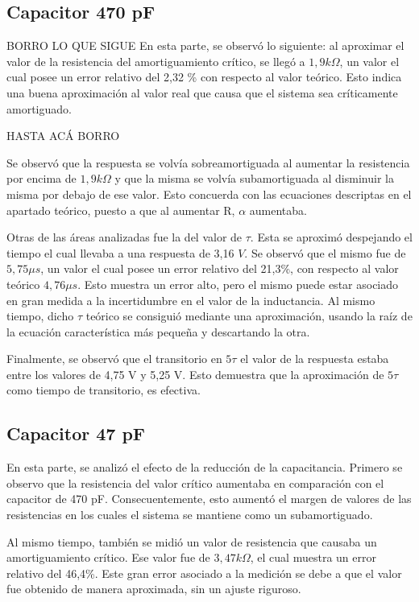 \documentclass{article}
\begin{document}
        \subsection*{Capacitor 470 pF}
        BORRO LO QUE SIGUE
        	En esta parte, se observó lo siguiente: al aproximar el valor de la resistencia del 
            amortiguamiento crítico, se llegó a $1,9 k\Omega$, un valor el cual posee un error 
            relativo del 2,32 \% 
            con respecto al valor teórico. Esto indica una buena aproximación al valor real que
             causa que el sistema sea críticamente amortiguado. \par
        HASTA ACÁ BORRO \par
	Se observó que la respuesta se volvía sobreamortiguada al aumentar la resistencia
     por encima de $1,9 k\Omega$ y que la misma se volvía subamortiguada al disminuir la misma por 
     debajo de ese valor. Esto concuerda con las ecuaciones descriptas en el apartado teórico, puesto 
     a que al aumentar R, $\alpha$ aumentaba. \par
	Otras de las áreas analizadas fue la del valor de $\tau$. Esta se aproximó despejando el tiempo 
    el cual llevaba a una respuesta de 3,16 $V$. Se observó que el mismo fue de $5,75 \mu s$, un valor el cual posee un error relativo del 21,3\%, con respecto al valor teórico $4,76 \mu s$. Esto muestra un error alto, pero el mismo puede estar asociado en gran medida a la incertidumbre en el valor de la inductancia. Al mismo tiempo, dicho $\tau$ teórico se consiguió mediante una aproximación, usando la raíz de la ecuación característica más pequeña y descartando la otra.\par
	Finalmente, se observó que el transitorio en $5\tau$ el valor de la respuesta estaba entre los
     valores de 4,75 V y 5,25 V. Esto demuestra que la aproximación de $5\tau$ como tiempo de 
     transitorio, es efectiva.
	
	
        \subsection*{Capacitor 47 pF}
        En esta parte, se analizó el efecto de la reducción de la capacitancia. Primero se observo que la resistencia del valor crítico aumentaba en comparación con el capacitor de 470 pF. Consecuentemente, esto aumentó el margen de valores de las resistencias en los cuales el sistema se mantiene como un subamortiguado.\par
        Al mismo tiempo, también se midió un valor de resistencia que causaba un amortiguamiento crítico. Ese valor fue de $3,47 k\Omega$, el cual muestra un error relativo del 46,4\%. Este gran error asociado a la medición se debe a que el valor fue obtenido de manera aproximada, sin un ajuste riguroso.\par 
        
\end{document}
